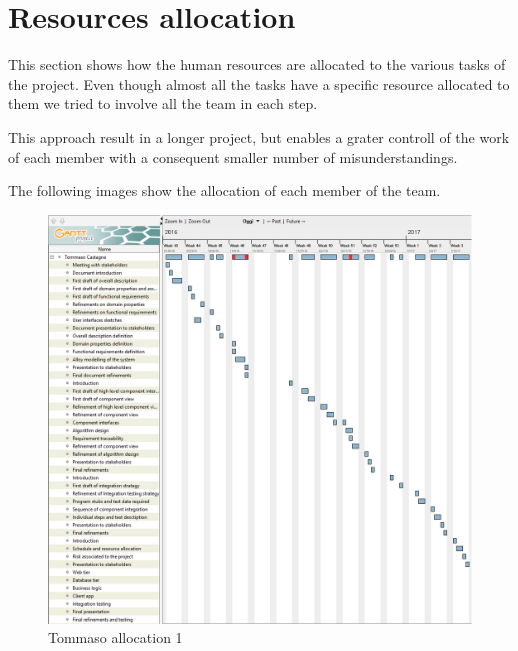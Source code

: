 \section{Resources allocation}

This section shows how the human resources are allocated to the various tasks of the project. 
Even though almost all the tasks have a specific resource allocated to them we tried to involve all the team in each step. 

This approach result in a longer project, but enables a grater controll of the work of each member with a consequent smaller number of misunderstandings.

The following images show the allocation of each member of the team.

\begin{figure}[H]
	\centerline{
	\includegraphics[width=500px]{../Datas/images/resource-tommaso-1.png}
	}
	\caption{Tommaso allocation 1}
		\label{fig:tasks-1}
\end{figure}

